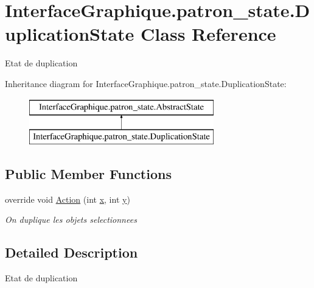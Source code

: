 \hypertarget{class_interface_graphique_1_1patron__state_1_1_duplication_state}{\section{Interface\-Graphique.\-patron\-\_\-state.\-Duplication\-State Class Reference}
\label{class_interface_graphique_1_1patron__state_1_1_duplication_state}
}


Etat de duplication  


Inheritance diagram for Interface\-Graphique.\-patron\-\_\-state.\-Duplication\-State\-:\begin{figure}[H]
\begin{center}
\leavevmode
\includegraphics[height=2.000000cm]{class_interface_graphique_1_1patron__state_1_1_duplication_state}
\end{center}
\end{figure}
\subsection*{Public Member Functions}
\begin{DoxyCompactItemize}
\item 
override void \hyperlink{class_interface_graphique_1_1patron__state_1_1_duplication_state_a3e4ab1c3a8bd3d03b822c66d7597e068}{Action} (int \hyperlink{group__inf2990_ga6150e0515f7202e2fb518f7206ed97dc}{x}, int \hyperlink{group__inf2990_ga0a2f84ed7838f07779ae24c5a9086d33}{y})
\begin{DoxyCompactList}\small\item\em On duplique les objets selectionnees \end{DoxyCompactList}\end{DoxyCompactItemize}


\subsection{Detailed Description}
Etat de duplication 



